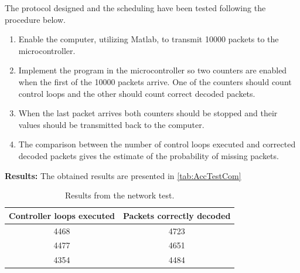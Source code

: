 The protocol designed and the scheduling have been tested following the procedure below.
\begin{enumerate}
	\item Enable the computer, utilizing Matlab, to transmit 10000 packets to the microcontroller.
    \item Implement the program in the microcontroller so two counters are enabled when the first of the 10000 packets arrive. One of the counters should count control loops and the other should count correct decoded packets.
	\item When the last packet arrives both counters should be stopped and their values should be transmitted back to the computer. 
	\item The comparison between the number of control loops executed and corrected decoded packets gives the estimate of the probability of missing packets.
\end{enumerate} 

\textbf{Results:}
The obtained results are presented in \autoref{tab:AccTestCom}
\begin{table}[]
    \centering
    \label{tab:AccTestCom}
    \begin{tabular}{|c|c|}
        \hline
       Controller loops executed  & Packets correctly decoded \\ \hline
       4468 &  4723\\ \hline
       4477 &  4651\\ \hline
       4354 &  4484\\ \hline
    \end{tabular}
    \caption{Results from the network test.}
\end{table}

